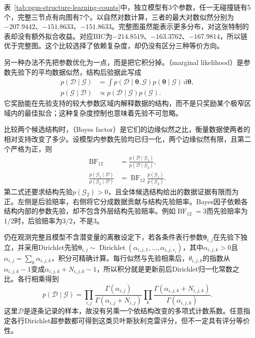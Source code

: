 表~\ref{tab:pgm-structure-learning-counts}中，独立模型有3个参数，任一无碰撞链有5个，完整三节点有向图有7个。以自然对数计算，三者的最大对数似然分别为$-207.9442$、$-151.8633$、$-151.8633$。完整图虽然能表示更多分布，对这张特制的表却没有额外拟合收益。对应BIC为$-214.8519$、$-163.3762$、$-167.9814$，所以链优于完整图。这个比较选择了依赖复杂度，却仍没有区分三种等价方向。

另一种办法不先把参数优化为一点，而是把它积分掉。（marginal likelihood）是参数先验下的平均数据似然，结构后验据此写成
\begin{equation}
  \begin{aligned}
    p(\mathcal{D}\mid\mathcal{G})
      &=\int p(\mathcal{D}\mid\bm{\theta},\mathcal{G})
              p(\bm{\theta}\mid\mathcal{G})\,\mathrm{d}\bm{\theta},\\
    p(\mathcal{G}\mid\mathcal{D})
      &\propto p(\mathcal{D}\mid\mathcal{G})p(\mathcal{G}).
  \end{aligned}
  \label{eq:pgm-structure-learning-posterior}
\end{equation}
它奖励能在先验支持的较大参数区域内解释数据的结构，而不是只奖励某个极窄区域内的最佳拟合；这种复杂度控制也意味着先验不可忽略。

比较两个候选结构时，（Bayes factor）是它们的边缘似然之比，衡量数据使两者的相对支持改变了多少。设模型内参数先验均已归一化，两个边缘似然有限，且第二个严格为正，则
\begin{equation}
  \begin{aligned}
    \operatorname{BF}_{12}
      &=\frac{p(\mathcal{D}\mid\mathcal{G}_1)}
              {p(\mathcal{D}\mid\mathcal{G}_2)},\\
    \frac{p(\mathcal{G}_1\mid\mathcal{D})}
         {p(\mathcal{G}_2\mid\mathcal{D})}
      &=\operatorname{BF}_{12}
        \frac{p(\mathcal{G}_1)}{p(\mathcal{G}_2)}.
  \end{aligned}
  \label{eq:pgm-structure-learning-bayes-factor}
\end{equation}
第二式还要求结构先验$p(\mathcal{G}_2)>0$，且全体候选结构给出的数据证据有限而为正。左侧是后验赔率，右侧将它分成数据贡献与结构先验赔率。Bayes因子依赖各结构内部的参数先验，却不包含外层结构先验赔率。例如$\operatorname{BF}_{12}=3$而先验赔率为$1/2$时，后验赔率为$3/2$，不是$3$。

仍在观测完整且模型不含潜变量的离散设定下，若各条件表行参数$\bm{\theta}_{i,j}$在先验下独立，并采用Dirichlet先验$\bm{\theta}_{i,j}\sim\operatorname{Dirichlet}(\alpha_{i,j,1},\ldots,\alpha_{i,j,r_i})$，其中$\alpha_{i,j,k}>0$且$\alpha_{i,j}=\sum_k\alpha_{i,j,k}$，积分可精确计算。每行似然与先验相乘后，$\theta_{i,j,k}$的指数从$\alpha_{i,j,k}-1$变成$\alpha_{i,j,k}+N_{i,j,k}-1$，所以积分就是更新前后Dirichlet归一化常数之比。各行相乘得到
\begin{equation}
  p(\mathcal{D}\mid\mathcal{G})
  =\prod_{i,j}
    \frac{\Gamma(\alpha_{i,j})}
         {\Gamma(\alpha_{i,j}+N_{i,j})}
    \prod_k
    \frac{\Gamma(\alpha_{i,j,k}+N_{i,j,k})}
         {\Gamma(\alpha_{i,j,k})}.
  \label{eq:pgm-structure-learning-dirichlet}
\end{equation}
这里$\mathcal{D}$是逐条记录的样本，故没有另乘一个依结构改变的多项式计数系数。任意指定各行Dirichlet超参数都可得到这类贝叶斯狄利克雷评分，但不一定具有评分等价性。


